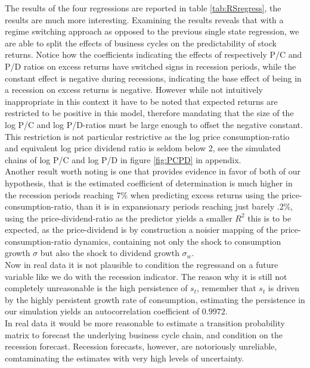 The results of the four regressions are reported in table \ref{tab:RSregress}, the results are much more interesting. Examining the results reveals that with a regime switching approach as opposed to the previous single state regression, we are able to split the effects of business cycles on the predictability of stock returns. Notice how the coefficients indicating the effects of respectively P/C and P/D ratios on excess returns have switched signs in recession periods, while the constant effect is negative during recessions, indicating the base effect of being in a recession on excess returns is negative. However while not intuitively inappropriate in this context it have to be noted that expected returns are restricted to be positive in this model, therefore mandating that the size of the log P/C and log P/D-ratios must be large enough to offset the negative constant. This restriction is not particular restrictive as the log price consumption-ratio and equivalent log price dividend ratio is seldom below 2, see the simulated chains of log P/C and log P/D in figure \ref{fig:PCPD} in appendix.\\

Another result worth noting is one that provides evidence in favor of both of our hypothesis, that is the estimated coefficient of determination is much higher in the recession periods reaching 7\% when predicting excess returns using the price-consumption-ratio, than it is in expansionary periods reaching just barely .2\%, using the price-dividend-ratio as the predictor yields a smaller $R^2$ this is to be expected, as the price-dividend is by construction a noisier mapping of the price-consumption-ratio dynamics, containing not only the shock to consumption growth $\sigma$ but also the shock to dividend growth $\sigma_w$.\\

Now in real data it is not plausible to condition the regressand on a future variable like we do with the recession indicator. The reason why it is still not completely unreasonable is the high persistence of $s_t$, remember that $s_t$ is driven by the highly persistent growth rate of consumption, estimating the persistence in our simulation yields an autocorrelation coefficient of $0.9972$.\\
In real data it would be more reasonable to estimate a transition probability matrix to forecast the underlying business cycle chain, and condition on the recession forecast. Recession forecasts, however, are notoriously unreliable, comtaminating the estimates with very high levels of uncertainty.


